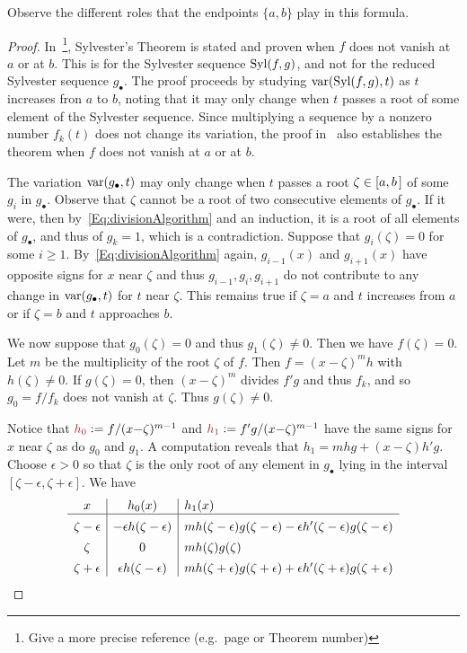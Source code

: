 Observe the different roles that the endpoints $\{a,b\}$ play in this formula.

\begin{proof}
  In~\cite{BCR}\footnote{Give a more precise reference (e.g.\ page or Theorem number)},
  Sylvester's Theorem is stated and proven when $f$ does not vanish at $a$ or at $b$.
  This is for the Sylvester sequence $\operatorname{{\rm Syl}}(f,g)$, and not for the reduced Sylvester sequence $g_\bullet$.
  The proof proceeds by studying $\operatorname{{\rm var}}(\operatorname{{\rm Syl}}(f,g), t)$ as $t$ increases fron $a$ to $b$, noting that it may only
  change when $t$ passes a root of some element of the Sylvester sequence.
  Since multiplying a sequence by a nonzero number $f_k(t)$ does not change its variation, the proof in~\cite{BCR} also establishes the
  theorem when $f$ does not vanish at $a$ or at $b$.

  The variation $\operatorname{{\rm var}}(g_\bullet,t)$ may only change when $t$ passes a root $\zeta\in[a,b\hspace{.05cm}]$ of some $g_i$ in
  $g_\bullet$. 
  Observe that $\zeta$ cannot be a root of two consecutive elements of $g_\bullet$.
  If it were, then by~\eqref{Eq:divisionAlgorithm} and an induction, it is a root of all elements of $g_\bullet$, and thus of $g_k=1$, which is a
  contradiction.
  Suppose that $g_i(\zeta)=0$ for some $i\geq 1$.
  By~\eqref{Eq:divisionAlgorithm} again, $g_{i-1}(x)$ and $g_{i+1}(x)$ have opposite signs for $x$ near $\zeta$ and thus
  $g_{i-1},g_i,g_{i+1}$ do not contribute to any change in $\operatorname{{\rm var}}(g_\bullet,t)$ for $t$ near $\zeta$.
  This remains true if $\zeta=a$ and $t$ increases from $a$ or if $\zeta=b$ and $t$ approaches $b$.

  We now suppose that $g_0(\zeta)=0$ and thus $g_1(\zeta)\neq 0$.
  Then we have $f(\zeta)=0$.
  Let $m$ be the multiplicity of the root $\zeta$ of $f$.
  Then $f=(x{-}\zeta)^m h$ with $h(\zeta)\neq 0$.
  If $g(\zeta)=0$, then $(x{-}\zeta)^m$ divides $f'g$ and thus $f_k$, and so $g_0=f/f_k$ does not vanish at $\zeta$.
  Thus $g(\zeta)\neq 0$.

  Notice that $\defcolor{h_0}\vcentcolon=f/(x{-}\zeta)^{m-1}$ and $\defcolor{h_1}\vcentcolon=f'g/(x{-}\zeta)^{m-1}$ have the same signs for
  $x$ near $\zeta$ as do $g_0$ and $g_1$.
  A computation reveals that $h_1=mhg+(x{-}\zeta)h'g$. 
 Choose $\epsilon>0$ so that $\zeta$ is the only root of any element in $g_\bullet$ lying in the interval
 $[\zeta-\epsilon,\zeta+\epsilon]$.
 We have
 \[
 \begin{array}{c|c|l}
   x & h_0(x) & h_1(x)\\\hline
   \zeta-\epsilon & -\epsilon h(\zeta-\epsilon)  &
        mh(\zeta-\epsilon)g(\zeta-\epsilon) - \epsilon h'(\zeta-\epsilon)g(\zeta-\epsilon)  \rule{0pt}{13pt}\\
   \zeta     &     0    &   mh(\zeta)g(\zeta)  \rule{0pt}{13pt}\\
   \zeta+\epsilon & \epsilon h(\zeta-\epsilon)  &
        mh(\zeta+\epsilon)g(\zeta+\epsilon) + \epsilon h'(\zeta+\epsilon)g(\zeta+\epsilon)  \rule{0pt}{13pt}
 \end{array}
 \]
 

\end{proof}
